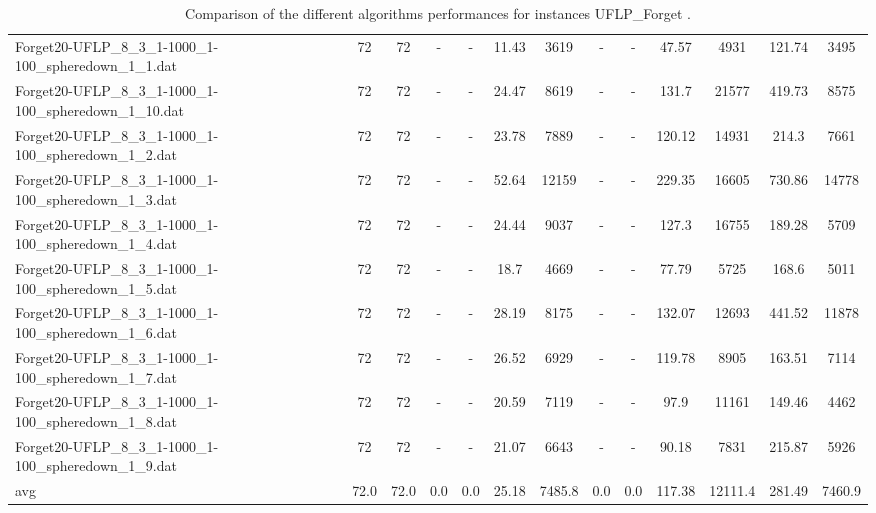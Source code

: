\begin{table}[!ht]
{\begin{tabular}{lcccccccccccc}
Forget20-UFLP\_8\_3\_1-1000\_1-100\_spheredown\_1\_1.dat & 72 & 72 &  - &  - & 11.43 & 3619 &  - &  - & 47.57 & 4931 & 121.74 & 3495 \\
Forget20-UFLP\_8\_3\_1-1000\_1-100\_spheredown\_1\_10.dat & 72 & 72 &  - &  - & 24.47 & 8619 &  - &  - & 131.7 & 21577 & 419.73 & 8575 \\
Forget20-UFLP\_8\_3\_1-1000\_1-100\_spheredown\_1\_2.dat & 72 & 72 &  - &  - & 23.78 & 7889 &  - &  - & 120.12 & 14931 & 214.3 & 7661 \\
Forget20-UFLP\_8\_3\_1-1000\_1-100\_spheredown\_1\_3.dat & 72 & 72 &  - &  - & 52.64 & 12159 &  - &  - & 229.35 & 16605 & 730.86 & 14778 \\
Forget20-UFLP\_8\_3\_1-1000\_1-100\_spheredown\_1\_4.dat & 72 & 72 &  - &  - & 24.44 & 9037 &  - &  - & 127.3 & 16755 & 189.28 & 5709 \\
Forget20-UFLP\_8\_3\_1-1000\_1-100\_spheredown\_1\_5.dat & 72 & 72 &  - &  - & 18.7 & 4669 &  - &  - & 77.79 & 5725 & 168.6 & 5011 \\
Forget20-UFLP\_8\_3\_1-1000\_1-100\_spheredown\_1\_6.dat & 72 & 72 &  - &  - & 28.19 & 8175 &  - &  - & 132.07 & 12693 & 441.52 & 11878 \\
Forget20-UFLP\_8\_3\_1-1000\_1-100\_spheredown\_1\_7.dat & 72 & 72 &  - &  - & 26.52 & 6929 &  - &  - & 119.78 & 8905 & 163.51 & 7114 \\
Forget20-UFLP\_8\_3\_1-1000\_1-100\_spheredown\_1\_8.dat & 72 & 72 &  - &  - & 20.59 & 7119 &  - &  - & 97.9 & 11161 & 149.46 & 4462 \\
Forget20-UFLP\_8\_3\_1-1000\_1-100\_spheredown\_1\_9.dat & 72 & 72 &  - &  - & 21.07 & 6643 &  - &  - & 90.18 & 7831 & 215.87 & 5926 \\
\hline avg & 72.0 & 72.0 &  0.0 & 0.0 &  25.18 & 7485.8 &  0.0 & 0.0 &  117.38 & 12111.4 &  281.49 & 7460.9 \\ \hline
\bottomrule
\end{tabular}
}%
\caption{Comparison of the different algorithms performances for instances UFLP_Forget .}
\end{table}
